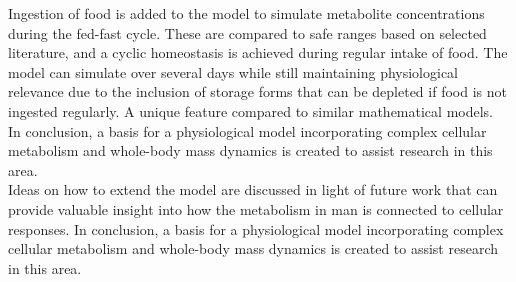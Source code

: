 Ingestion of food is added to the model to simulate metabolite concentrations during the fed-fast cycle. These are compared to safe ranges based on selected literature, and a cyclic homeostasis is achieved during regular intake of food. The model can simulate over several days while still maintaining physiological relevance due to the inclusion of storage forms that can be depleted if food is not ingested regularly. A unique feature compared to similar mathematical models. \\

In conclusion, a basis for a physiological model incorporating complex cellular metabolism and whole-body mass dynamics is created to assist research in this area. \\


Ideas on how to extend the model are discussed in light of future work that can provide valuable insight into how the metabolism in man is connected to cellular responses. In conclusion, a basis for a physiological model incorporating complex cellular metabolism and whole-body mass dynamics is created to assist research in this area.
